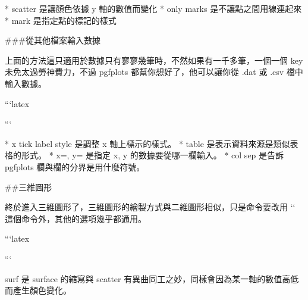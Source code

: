 \begin{markdown}
* scatter 是讓顏色依據 y 軸的數值而變化
* only marks 是不讓點之間用線連起來
* mark 是指定點的標記的樣式

###從其他檔案輸入數據

上面的方法這只適用於數據只有寥寥幾筆時，不然如果有一千多筆，一個一個 key 未免太過勞神費力，不過 pgfplots 都幫你想好了，他可以讓你從 .dat 或 .csv 檔中輸入數據。

```latex
```

* x tick label style 是調整 x 軸上標示的樣式。
* table 是表示資料來源是類似表格的形式。
* x=, y= 是指定 x, y 的數據要從哪一欄輸入。
* col sep 是告訴 pgfplots 欄與欄的分界是用什麼符號。

##三維圖形

終於進入三維圖形了，三維圖形的繪製方式與二維圖形相似，只是命令要改用 `` 這個命令外，其他的選項幾乎都通用。

```latex
```

surf 是 surface 的縮寫與 scatter 有異曲同工之妙，同樣會因為某一軸的數值高低而產生顏色變化。

\end{markdown}
